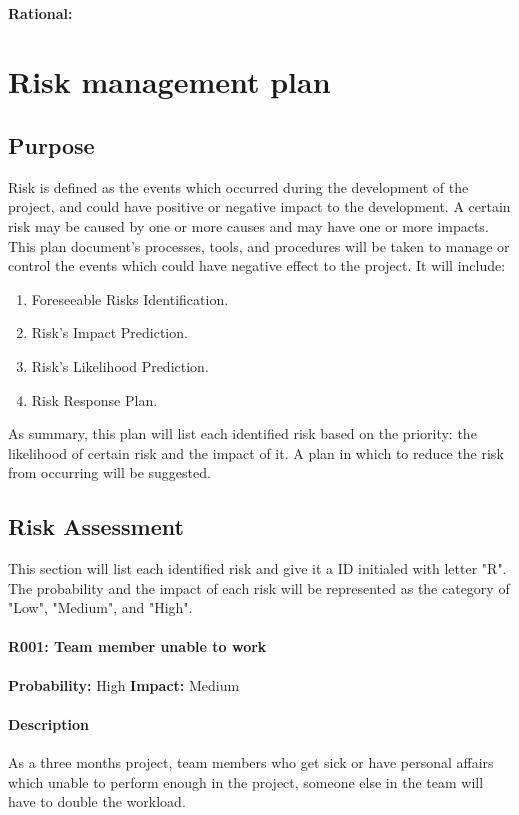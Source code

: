 \documentclass[11pt, a4paper]{report}
\begin{document}
\paragraph{Rational: \\}


\section{Risk management plan}
\subsection{Purpose}
Risk is defined as the events which occurred during the development of the project, and could have positive or negative impact to the development. A certain risk may be caused by one or more causes and may have one or more impacts. This plan document's processes, tools, and procedures will be taken to manage or control the events which could have negative effect to the project. It will include:
\begin{enumerate}
	\item Foreseeable Risks Identification.
	\item Risk's Impact Prediction.
	\item Risk's Likelihood Prediction.
	\item Risk Response Plan.
\end{enumerate}
As summary, this plan will list each identified risk based on the priority: the likelihood of certain risk and the impact of it. A plan in which to reduce the risk from occurring will be suggested.

\subsection{Risk Assessment}
This section will list each identified risk and give it a ID initialed with letter "R". The probability and the impact of each risk will be represented as the category of "Low", "Medium", and "High". \\




	\paragraph{R001: Team member unable to work} \hspace{1cm} \textbf{Probability: }High\hspace{1cm}   \textbf{Impact: }Medium
	\paragraph{Description}As a three months project, team members who get sick or have personal affairs which unable to perform enough in the project, someone else in the team will have to double the workload.
\end{document}
